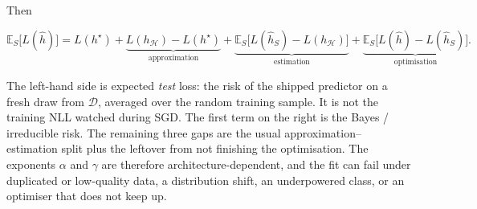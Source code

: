 \documentclass[11pt,a4paper]{article}
\theoremstyle{definition}
\begin{document}
Then

\[
\mathbb{E}_S\bigl[L(\widehat h)\bigr]
=
L(h^\star)
+\underbrace{L(h_{\mathcal{H}})-L(h^\star)}_{\text{approximation}}
+\underbrace{\mathbb{E}_S\bigl[L(\widehat h_S)-L(h_{\mathcal{H}})\bigr]}_{\text{estimation}}
+\underbrace{\mathbb{E}_S\bigl[L(\widehat h)-L(\widehat h_S)\bigr]}_{\text{optimisation}}.
\]

The left-hand side is expected \emph{test} loss: the risk of the shipped predictor on a fresh draw from \(\mathcal{D}\), averaged over the random training sample. It is not the training NLL watched during SGD. The first term on the right is the Bayes / irreducible risk. The remaining three gaps are the usual approximation--estimation split plus the leftover from not finishing the optimisation. The exponents \(\alpha\) and \(\gamma\) are therefore architecture-dependent, and the fit can fail under duplicated or low-quality data, a distribution shift, an underpowered class, or an optimiser that does not keep up.
\end{document}
